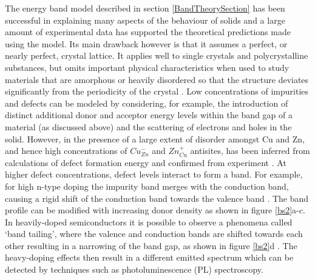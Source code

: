 \documentclass[11pt, twoside]{report}
\begin{document}
The energy band model described in section \ref{BandTheorySection} has been successful in explaining many aspects of the behaviour of solids and a large amount of experimental data has supported the theoretical predictions made using the model. Its main drawback however is that it assumes a perfect, or nearly perfect, crystal lattice. It applies well to single crystals and polycrystalline substances, but omits important physical characteristics when used to study materials that are amorphous or heavily disordered so that the structure deviates significantly from the periodicity of the crystal \cite{small_semiconductor1}.
Low concentrations of impurities and defects can be modeled by considering, for example, the introduction of distinct additional donor and acceptor energy levels within the band gap of a material (as discussed above) and the scattering of electrons and holes in the solid. However, in {\CZTS} the presence of a large extent of disorder amongst Cu and Zn, and hence high concentrations of $Cu_{Zn}^{-}$ and $Zn_{Cu}^{+}$ antisites, has been inferred from calculations of defect formation energy \cite{defects_Chen} and confirmed from experiment \cite{Schorr, CZTS_Xray, CZTS_TEM}. 
At higher defect concentrations, defect levels interact to form a band. For example, for high n-type doping the impurity band merges with the conduction band, causing a rigid shift of the conduction band towards the valence band \cite{Pankove}. The band profile can be modified with increasing donor density as shown in figure \ref{bs2}a-c. 
In heavily-doped semiconductors it is possible to observe a phenomena called `band tailing', where the valence and conduction bands are shifted towards each other resulting in a narrowing of the band gap, as shown in figure \ref{bs2}d \cite{Pankove}. The heavy-doping effects then result in a different emitted spectrum which can be detected by techniques such as photoluminescence (PL) spectroscopy. 
\end{document}

